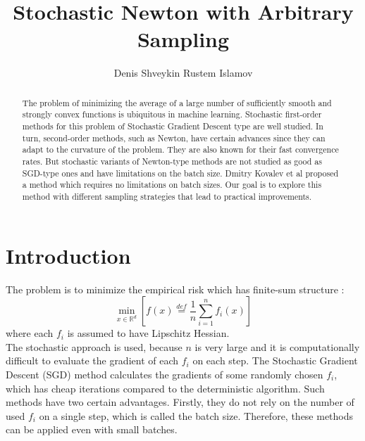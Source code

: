 \documentclass{article}
\title{Stochastic Newton with Arbitrary Sampling}
\author{Denis Shveykin
	\And
	Rustem Islamov
}
\date{}
\begin{document}
	
\maketitle

\begin{abstract}
	
	The problem of minimizing the average of a large number of sufficiently smooth and strongly convex functions is ubiquitous in machine learning. Stochastic first-order methods for this problem of Stochastic Gradient Descent type are well studied. In turn, second-order methods, such as Newton, have certain advances since they can adapt to the curvature of the problem. They are also known for their fast convergence rates. But stochastic variants of Newton-type methods are not studied as good as SGD-type ones and have limitations on the batch size. Dmitry Kovalev et al proposed a method which requires no limitations on batch sizes. Our goal is to explore this method with different sampling strategies that lead to practical improvements.
	
\end{abstract}



\section{Introduction}

	The problem is to minimize the empirical risk which has finite-sum structure \cite{kovalev2019stochastic}:
	\begin{equation}
		\underset{x \in \mathbb R^d}{\min} \left[ f(x) \overset{def}{=} \frac{1}{n} \sum \limits_{i=1}^n f_i(x) \right]
	\end{equation}
	where each $f_i$ is assumed to have Lipschitz Hessian. \\
	
	The stochastic approach is used, because $n$ is very large and it is computationally difficult to evaluate the gradient of each $f_i$ on each step. The Stochastic Gradient Descent (SGD) method \cite{SGD-1} calculates the gradients of some randomly chosen $f_i$, which has cheap iterations compared to the deterministic algorithm. Such methods have two certain advantages. Firstly, they do not rely on the number of used $f_i$ on a single step, which is called the batch size. Therefore, these methods can be applied even with small batches. \\
	
\end{document}
